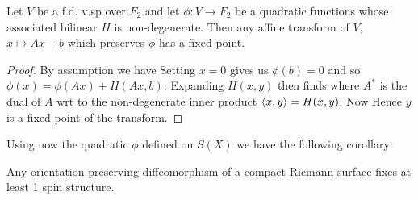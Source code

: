 \documentclass{article}
\begin{document}
\begin{lemma}\label{lemma: preserving quadratic gives fixed point}
	Let $V$ be a f.d. v.sp over $F_2$ and let $\phi:V \to F_2$ be a quadratic functions whose associated bilinear $H$ is non-degenerate. Then any affine transform of $V$, $x \mapsto Ax+b$ which preserves $\phi$ has a fixed point.  
\end{lemma}
\begin{proof}
	By assumption we have
Setting $x=0$ gives us $\phi(b)=0$ and so $\phi(x) = \phi(Ax)+H(Ax,b)$. Expanding $H(x,y)$ then finds 
where $A^\ast$ is the dual of $A$ wrt to the non-degenerate inner product $\left\langle x,y \right\rangle = H(x,y)$. Now 
Hence $y$ is a fixed point of the transform. 
\end{proof}

Using now the quadratic $\phi$ defined on $S(X)$ we have the following corollary:

\begin{corollary}
	Any orientation-preserving diffeomorphism of a compact Riemann surface fixes at least 1 spin structure.
\end{corollary}
\end{document}
